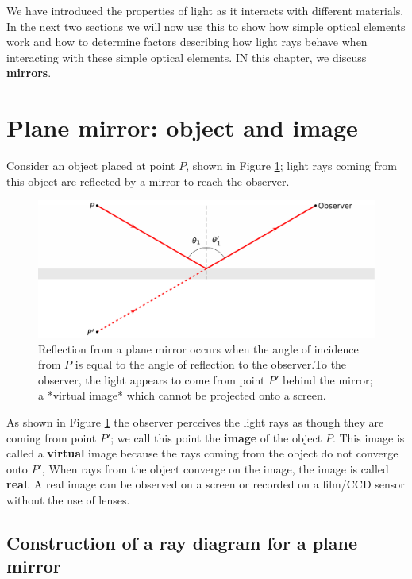 \documentclass[
]{book}
\begin{document}
We have introduced the properties of light as it interacts with different materials. In the next two sections we will now use this to show how simple optical elements work and how to determine factors describing how light rays behave when interacting with these simple optical elements. IN this chapter, we discuss \textbf{mirrors}.

\hypertarget{sec:ch15-planemirror1}{%
\section{Plane mirror: object and image}\label{sec:ch15-planemirror1}}

Consider an object placed at point \(P\), shown in Figure \ref{fig:ch15-planemirror1}; light rays coming from this object are reflected by a mirror to reach the observer.

\begin{figure}

{\centering \includegraphics[width=0.7\linewidth]{visualisations/LaTeX/ch15-planemirror1} 

}

\caption{Reflection from a plane mirror occurs when the angle of incidence from $P$ is equal to the angle of reflection to the observer.To the observer, the light appears to come from point $P'$ behind the mirror; a *virtual image* which cannot be projected onto a screen.}\label{fig:ch15-planemirror1}
\end{figure}

As shown in Figure \ref{fig:ch15-planemirror1} the observer perceives the light rays as though they are coming from point \(P'\); we call this point the \textbf{image} of the object \(P\). This image is called a \textbf{virtual} image because the rays coming from the object do not converge onto \(P'\), When rays from the object converge on the image, the image is called \textbf{real}. A real image can be observed on a screen or recorded on a film/CCD sensor without the use of lenses.

\hypertarget{sec:ch15-planemirror2}{%
\subsection{Construction of a ray diagram for a plane mirror}\label{sec:ch15-planemirror2}}
\end{document}
